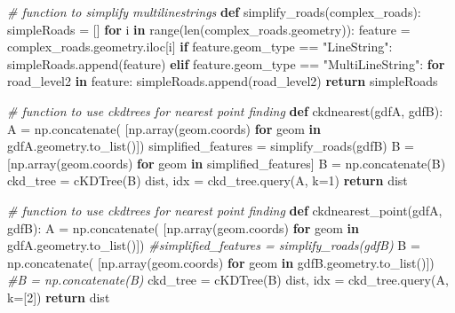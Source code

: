 \documentclass[]{article}
\newenvironment{Shaded}{}{}
\newcommand{\BuiltInTok}[1]{#1}
\newcommand{\CommentTok}[1]{\textcolor[rgb]{0.38,0.63,0.69}{\textit{#1}}}
\newcommand{\ControlFlowTok}[1]{\textcolor[rgb]{0.00,0.44,0.13}{\textbf{#1}}}
\newcommand{\DecValTok}[1]{\textcolor[rgb]{0.25,0.63,0.44}{#1}}
\newcommand{\KeywordTok}[1]{\textcolor[rgb]{0.00,0.44,0.13}{\textbf{#1}}}
\newcommand{\NormalTok}[1]{#1}
\newcommand{\OperatorTok}[1]{\textcolor[rgb]{0.40,0.40,0.40}{#1}}
\newcommand{\StringTok}[1]{\textcolor[rgb]{0.25,0.44,0.63}{#1}}
\begin{document}
\begin{Shaded}
\begin{Highlighting}[]
\CommentTok{# function to simplify multilinestrings}
\KeywordTok{def}\NormalTok{ simplify_roads(complex_roads):}
\NormalTok{    simpleRoads }\OperatorTok{=}\NormalTok{ []}
    \ControlFlowTok{for}\NormalTok{ i }\KeywordTok{in} \BuiltInTok{range}\NormalTok{(}\BuiltInTok{len}\NormalTok{(complex_roads.geometry)):}
\NormalTok{        feature }\OperatorTok{=}\NormalTok{ complex_roads.geometry.iloc[i]}
        \ControlFlowTok{if}\NormalTok{ feature.geom_type }\OperatorTok{==} \StringTok{"LineString"}\NormalTok{:}
\NormalTok{            simpleRoads.append(feature)}
        \ControlFlowTok{elif}\NormalTok{ feature.geom_type }\OperatorTok{==} \StringTok{"MultiLineString"}\NormalTok{:}
            \ControlFlowTok{for}\NormalTok{ road_level2 }\KeywordTok{in}\NormalTok{ feature:}
\NormalTok{                simpleRoads.append(road_level2)}
    \ControlFlowTok{return}\NormalTok{ simpleRoads}


\CommentTok{# function to use ckdtrees for nearest point finding}
\KeywordTok{def}\NormalTok{ ckdnearest(gdfA, gdfB):}
\NormalTok{    A }\OperatorTok{=}\NormalTok{ np.concatenate(}
\NormalTok{    [np.array(geom.coords) }\ControlFlowTok{for}\NormalTok{ geom }\KeywordTok{in}\NormalTok{ gdfA.geometry.to_list()])}
\NormalTok{    simplified_features }\OperatorTok{=}\NormalTok{ simplify_roads(gdfB)}
\NormalTok{    B }\OperatorTok{=}\NormalTok{ [np.array(geom.coords) }\ControlFlowTok{for}\NormalTok{ geom }\KeywordTok{in}\NormalTok{ simplified_features]}
\NormalTok{    B }\OperatorTok{=}\NormalTok{ np.concatenate(B)}
\NormalTok{    ckd_tree }\OperatorTok{=}\NormalTok{ cKDTree(B)}
\NormalTok{    dist, idx }\OperatorTok{=}\NormalTok{ ckd_tree.query(A, k}\OperatorTok{=}\DecValTok{1}\NormalTok{)}
    \ControlFlowTok{return}\NormalTok{ dist}


\CommentTok{# function to use ckdtrees for nearest point finding}
\KeywordTok{def}\NormalTok{ ckdnearest_point(gdfA, gdfB):}
\NormalTok{    A }\OperatorTok{=}\NormalTok{ np.concatenate(}
\NormalTok{    [np.array(geom.coords) }\ControlFlowTok{for}\NormalTok{ geom }\KeywordTok{in}\NormalTok{ gdfA.geometry.to_list()])}
    \CommentTok{#simplified_features = simplify_roads(gdfB)}
\NormalTok{    B }\OperatorTok{=}\NormalTok{ np.concatenate(}
\NormalTok{    [np.array(geom.coords) }\ControlFlowTok{for}\NormalTok{ geom }\KeywordTok{in}\NormalTok{ gdfB.geometry.to_list()])}
    \CommentTok{#B = np.concatenate(B)}
\NormalTok{    ckd_tree }\OperatorTok{=}\NormalTok{ cKDTree(B)}
\NormalTok{    dist, idx }\OperatorTok{=}\NormalTok{ ckd_tree.query(A, k}\OperatorTok{=}\NormalTok{[}\DecValTok{2}\NormalTok{])}
    \ControlFlowTok{return}\NormalTok{ dist}



\end{Highlighting}
\end{Shaded}
\end{document}
